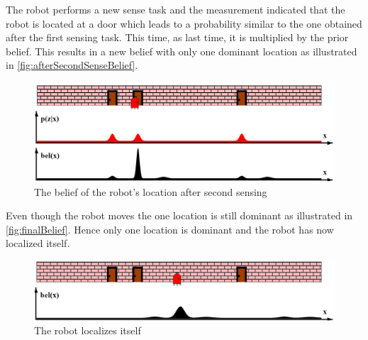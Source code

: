 The robot performs a new sense task and the measurement indicated that the robot is located at a door which leads to a probability similar to the one obtained after the first sensing task. This time, as last time, it is multiplied by the prior belief. This results in a new belief with only one dominant location as illustrated in \autoref{fig:afterSecondSenseBelief}. 

\begin{figure}[H]
\centering
\includegraphics[scale=0.36]{images/MarkovLocalizationD}
\caption{The belief of the robot's location after second sensing}
\label{fig:afterSecondSenseBelief}
\end{figure}

Even though the robot moves the one location is still dominant as illustrated in \autoref{fig:finalBelief}. Hence only one location is dominant and the robot has now localized itself.

\begin{figure}[H]
\centering
\includegraphics[scale=0.36]{images/MarkovLocalizationE}
\caption{The robot localizes itself}
\label{fig:finalBelief}
\end{figure}


